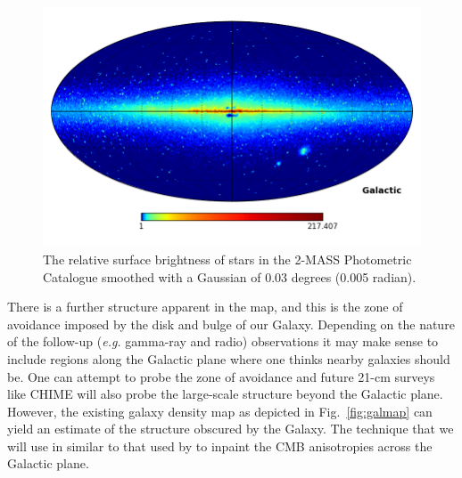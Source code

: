 \documentclass[useAMS,usenatbib]{mn2e}
\begin{document}
\begin{figure}
  \includegraphics[width=\columnwidth,clip,trim=0 1in 0 0]{2mass_density}
  \caption{The relative surface brightness of stars in the 2-MASS
    Photometric Catalogue \citep{2006AJ....131.1163S} smoothed with a Gaussian
    of 0.03 degrees (0.005 radian).}
  \label{fig:starmap}
\end{figure}
There is a further structure apparent in the map, and this is the zone
of avoidance imposed by the disk and bulge of our Galaxy. Depending on
the nature of the follow-up ({\em e.g.} gamma-ray and radio)
observations it may make sense to include regions along the Galactic
plane where one thinks nearby galaxies should be. One can attempt to
probe the zone of avoidance \citep[e.g][]{2000AJ....120..298J} and
future 21-cm surveys like CHIME \citep{2014era..conf10102V} will also
probe the large-scale structure beyond the Galactic plane.  However,
the existing galaxy density map as depicted in Fig.~\ref{fig:galmap}
can yield an estimate of the structure obscured by the Galaxy.  The
technique that we will use in similar to that used by
\citet{2008StMet...5..289A} to inpaint the CMB anisotropies across the
Galactic plane.
\end{document}
